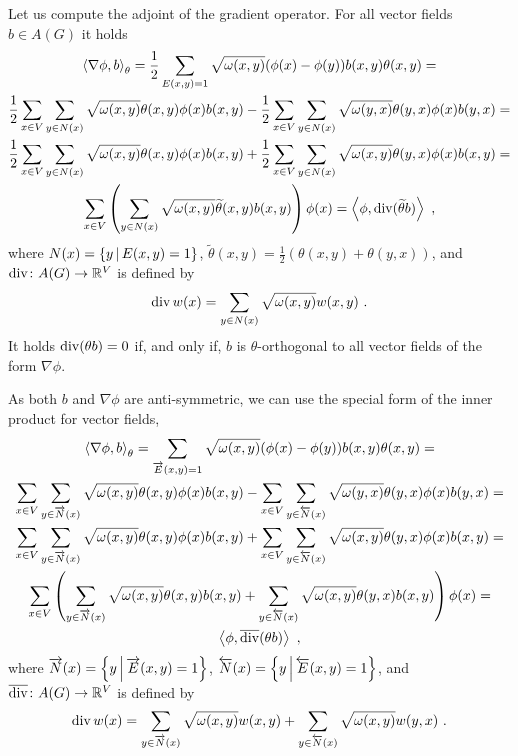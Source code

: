 \documentclass[12pt,a4paper]{amsart}
\begin{document}
Let us compute the adjoint of the gradient operator. For all vector
fields $b \in A(G)$ it holds
\begin{multline*}
  \left\langle\nabla \phi,b\right\rangle_{\theta}  = \frac12 \sum_{E(x,y)=1}
  \sqrt{\omega(x,y)}  (\phi(x) - \phi(y)) b(x,y) \theta(x,y)= \\
  \frac12 \sum_{x \in V} \sum_{y \in N(x)} \sqrt{\omega(x,y)}
  \theta(x,y) \phi(x)
b(x,y) - \frac12 \sum_{x \in V} \sum_{y \in N(x)}
  \sqrt{\omega(y,x)}  \theta(y,x) \phi(x) b(y,x) = \\ \frac12 \sum_{x \in V} \sum_{y \in N(x)} \sqrt{\omega(x,y)}
  \theta(x,y) \phi(x)
b(x,y) + \frac12 \sum_{x \in V} \sum_{y \in N(x)}
  \sqrt{\omega(x,y)}  \theta(y,x) \phi(x) b(x,y) = \\ \sum_{x \in V}
  \left(\sum_{y \in N(x)} \sqrt{\omega(x,y)}  \widetilde \theta(x,y) b(x,y) \right) \phi(x) =
  \left\langle\phi,\operatorname*{div}(\widetilde \theta b)\right\rangle \ ,
\end{multline*}
where $N(x) = \left\{y \, \middle| \, E(x,y)=1 \right\}$, $\widetilde \theta(x,y) = \frac12
(\theta(x,y)+\theta(y,x))$,  and $\operatorname*{div} \colon A(G) \to \mathbb{R}^V$ is defined by
\begin{equation*}
  \operatorname*{div} w (x) = \sum_{y \in N(x)} \sqrt {\omega(x,y)} w(x,y) \ . 
\end{equation*}
It holds $\operatorname*{div}(\theta b) = 0$ if, and only if, $b$ is $\theta$-orthogonal to
all vector fields of the form  $\nabla  \phi$. 

As both $b$ and $\nabla \phi$ are anti-symmetric, we can use the special form of the inner product for vector fields,
\begin{multline*}
  \left\langle\nabla \phi,b\right\rangle_{\theta}  = \sum_{\overrightarrow E(x,y)=1}
  \sqrt{\omega(x,y)}  (\phi(x) - \phi(y)) b(x,y) \theta(x,y)= \\
  \sum_{x \in V} \sum_{y \in \overrightarrow N(x)} \sqrt{\omega(x,y)}
  \theta(x,y) \phi(x)
b(x,y) - \sum_{x \in V} \sum_{y \in \overleftarrow N(x)}
  \sqrt{\omega(y,x)}  \theta(y,x) \phi(x) b(y,x) = \\ \sum_{x \in V}
  \sum_{y \in \overrightarrow N(x)} \sqrt{\omega(x,y)}
  \theta(x,y) \phi(x)
b(x,y) + \sum_{x \in V} \sum_{y \in \overleftarrow N(x)}
  \sqrt{\omega(x,y)}  \theta(y,x) \phi(x) b(x,y) = \\ \sum_{x \in V}
  \left(\sum_{y \in \overrightarrow N(x)} \sqrt{\omega(x,y)} \theta(x,y)
    b(x,y) + \sum_{y \in \overleftarrow N(x)} \sqrt{\omega(x,y)} \theta(y,x)
    b(x,y) \right) \phi(x) = \\
  \left\langle\phi,\overline {\operatorname*{div}}(\theta b)\right\rangle \ ,
\end{multline*}
where $\overrightarrow N(x) = \left\{y \, \middle| \, \overrightarrow E(x,y)=1 \right\}$,
$\overleftarrow N(x) = \left\{y \, \middle| \, \overleftarrow E(x,y)=1 \right\}$, and $\overline{\operatorname*{div}} \colon A(G) \to \mathbb{R}^V$ is defined by
\begin{equation*}
  \Div w (x) = \sum_{y \in \overrightarrow N(x)} \sqrt {\omega(x,y)}
  w(x,y) + \sum_{y \in \overleftarrow N(x)} \sqrt {\omega(x,y)} w(y,x) \ . 
\end{equation*}
\end{document}
